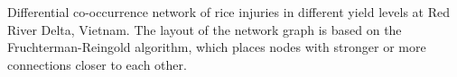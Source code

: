 Differential co-occurrence network of rice injuries in different yield levels at Red River Delta, Vietnam. The layout of the network graph is based on the Fruchterman-Reingold algorithm, which places nodes with stronger or more connections closer to each other.
        \label{fig:difyieldRR}